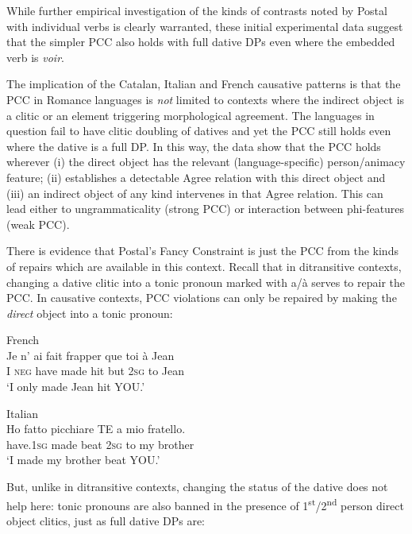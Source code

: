 \documentclass[output=paper,colorlinks,citecolor=brown,nonflat]{./langscibook}
\begin{document}
While further empirical investigation of the kinds of contrasts noted by Postal with individual verbs is clearly warranted, these initial experimental data suggest that the simpler PCC also holds with full dative DPs even where the embedded verb is \textit{voir}. 

The implication of the Catalan, Italian and French causative patterns is that the PCC in Romance languages is \textit{not} limited to contexts where the indirect object is a clitic or an element triggering morphological agreement. The languages in question fail to have clitic doubling of datives and yet the PCC still holds even where the dative is a full DP. In this way, the data show that the PCC holds wherever (i) the direct object has the relevant (language-specific) person/animacy feature; (ii) \liv establishes a detectable Agree relation with this direct object and (iii) an indirect object of any kind intervenes in that Agree relation. This can lead either to ungrammaticality (strong PCC) or interaction between phi-features (weak PCC).  

There is evidence that Postal’s Fancy Constraint is just the PCC from the kinds of repairs which are available in this context. Recall that in ditransitive contexts, changing a dative clitic into a tonic pronoun marked with a/à serves to repair the PCC. In causative contexts, PCC violations can only be repaired by making the \textit{direct} object into a tonic pronoun:

\ea%
    \label{ex:sheehan:26}
    French\\
    \gll    Je   n’  ai   fait   frapper   que   toi   à   Jean\\
            I   \textsc{neg}   have   made   hit   but   2\textsc{sg}   to   Jean\\
    \glt    ‘I only made Jean hit YOU.’
\z

\ea%
    \label{ex:sheehan:27}
    Italian\\
    \gll    Ho       fatto   picchiare   TE  a  mio  fratello.\\
            have.\textsc{1sg}   made   beat  2\textsc{sg}   to  my  brother\\
    \glt    ‘I made my brother beat YOU.’
\z

But, unlike in ditransitive contexts, changing the status of the dative does not help here: tonic pronouns are also banned in the presence of 1\textsuperscript{st}/2\textsuperscript{nd} person direct object clitics, just as full dative DPs are:
\end{document}
